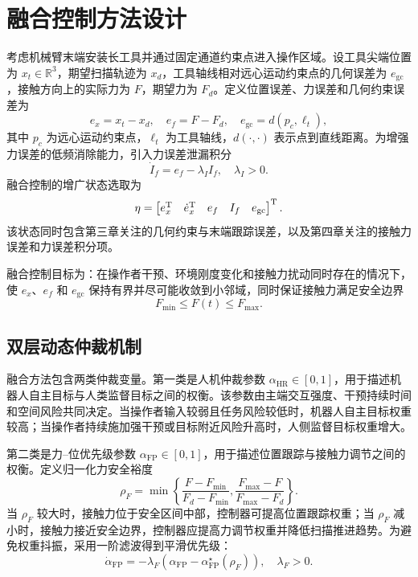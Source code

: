 \section{融合控制方法设计}
\label{sec:ch5_problem}

考虑机械臂末端安装长工具并通过固定通道约束点进入操作区域。设工具尖端位置为 $x_t\in\mathbb{R}^3$，期望扫描轨迹为 $x_d$，工具轴线相对远心运动约束点的几何误差为 $e_{\mathrm{gc}}$，接触方向上的实际力为 $F$，期望力为 $F_d$。定义位置误差、力误差和几何约束误差为
\begin{equation}
  e_x=x_t-x_d,\quad e_f=F-F_d,\quad e_{\mathrm{gc}}=d(p_c,\ell_t),
  \label{eq:ch5_errors}
\end{equation}
其中 $p_c$ 为远心运动约束点，$\ell_t$ 为工具轴线，$d(\cdot,\cdot)$ 表示点到直线距离。为增强力误差的低频消除能力，引入力误差泄漏积分
\begin{equation}
  \dot I_f=e_f-\lambda_I I_f,\quad \lambda_I>0 .
  \label{eq:ch5_force_integral}
\end{equation}
融合控制的增广状态选取为
\begin{equation}
  \eta=\begin{bmatrix} e_x^{\mathrm{T}} & \dot e_x^{\mathrm{T}} & e_f & I_f & e_{\mathrm{gc}} \end{bmatrix}^{\mathrm{T}}.
  \label{eq:ch5_aug_state}
\end{equation}
该状态同时包含第三章关注的几何约束与末端跟踪误差，以及第四章关注的接触力误差和力误差积分项。

融合控制目标为：在操作者干预、环境刚度变化和接触力扰动同时存在的情况下，使 $e_x$、$e_f$ 和 $e_{\mathrm{gc}}$ 保持有界并尽可能收敛到小邻域，同时保证接触力满足安全边界
\begin{equation}
  F_{\min}\le F(t)\le F_{\max}.
  \label{eq:ch5_force_safe_bound}
\end{equation}

\subsection{双层动态仲裁机制}
\label{sec:ch5_arbitration}

融合方法包含两类仲裁变量。第一类是人机仲裁参数 $\alpha_{\mathrm{HR}}\in[0,1]$，用于描述机器人自主目标与人类监督目标之间的权衡。该参数由主端交互强度、干预持续时间和空间风险共同决定。当操作者输入较弱且任务风险较低时，机器人自主目标权重较高；当操作者持续施加强干预或目标附近风险升高时，人侧监督目标权重增大。

第二类是力--位优先级参数 $\alpha_{\mathrm{FP}}\in[0,1]$，用于描述位置跟踪与接触力调节之间的权衡。定义归一化力安全裕度
\begin{equation}
  \rho_F=\min\left\{\frac{F-F_{\min}}{F_d-F_{\min}},\frac{F_{\max}-F}{F_{\max}-F_d}\right\}.
  \label{eq:ch5_force_margin}
\end{equation}
当 $\rho_F$ 较大时，接触力位于安全区间中部，控制器可提高位置跟踪权重；当 $\rho_F$ 减小时，接触力接近安全边界，控制器应提高力调节权重并降低扫描推进趋势。为避免权重抖振，采用一阶滤波得到平滑优先级：
\begin{equation}
  \dot\alpha_{\mathrm{FP}}=-\lambda_F\left(\alpha_{\mathrm{FP}}-\alpha_{\mathrm{FP}}^{\star}(\rho_F)\right),
  \quad \lambda_F>0 .
  \label{eq:ch5_fp_filter}
\end{equation}

